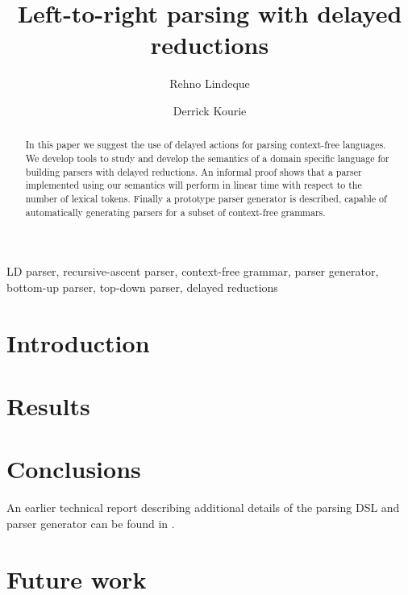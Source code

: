 \documentclass[envcountsame,runningheads]{llncs}
\begin{document}
\title{Left-to-right parsing with delayed reductions}
\author{Rehno Lindeque \and Derrick Kourie}
\maketitle

\begin{abstract}
In this paper we suggest the use of delayed actions for parsing context-free languages.
We develop tools to study and develop the semantics of a domain specific language for building parsers with delayed reductions.
An informal proof shows that a parser implemented using our semantics will perform in linear time with respect to the number of lexical tokens.
Finally a prototype parser generator is described, capable of automatically generating parsers for a subset of context-free grammars.
\end{abstract}

\begin{keywords}
LD parser, recursive-ascent parser, context-free grammar, parser generator, bottom-up parser, top-down parser, delayed reductions
\end{keywords}

\section{Introduction}


\section{Results}

\section{Conclusions}
An earlier technical report describing additional details of the parsing DSL and parser generator can be found in \cite{Lin11}.

\section{Future work}



\end{document}
